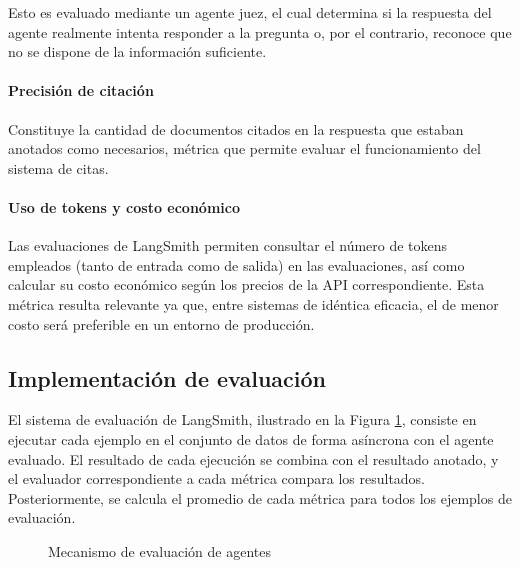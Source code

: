 Esto es evaluado mediante un agente juez, el cual determina si la respuesta del agente realmente intenta responder a la pregunta o, por el contrario, reconoce que no se dispone de la información suficiente.

\paragraph{Precisión de citación} Constituye la cantidad de documentos citados en la respuesta que estaban anotados como necesarios, métrica que permite evaluar el funcionamiento del sistema de citas.

\paragraph{Uso de tokens y costo económico} Las evaluaciones de LangSmith permiten consultar el número de tokens empleados (tanto de entrada como de salida) en las evaluaciones, así como calcular su costo económico según los precios de la API correspondiente. Esta métrica resulta relevante ya que, entre sistemas de idéntica eficacia, el de menor costo será preferible en un entorno de producción.

\subsection{Implementación de evaluación}
\label{sec:langsmith}
El sistema de evaluación de LangSmith, ilustrado en la Figura \ref{fig:mem_1}, consiste en ejecutar cada ejemplo en el conjunto de datos de forma asíncrona con el agente evaluado. El resultado de cada ejecución se combina con el resultado anotado, y el evaluador correspondiente a cada métrica compara los resultados. Posteriormente, se calcula el promedio de cada métrica para todos los ejemplos de evaluación.

\begin{figure}[h]
\centering
{}
\caption{Mecanismo de evaluación de agentes}
\label{fig:mem_1}
\end{figure}


